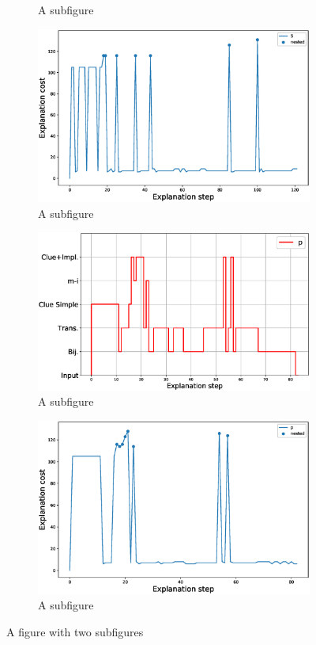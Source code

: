 {\begin{figure}[t!]
\begin{subfigure}{.5\textwidth}
		\caption{A subfigure}
	\end{subfigure}%
	\begin{subfigure}{.5\textwidth}
		\centering
		\includegraphics[width=0.9\linewidth]{figures/5.eps}
		\caption{A subfigure}
	\end{subfigure}
	\begin{subfigure}{.5\textwidth}
		\centering
		\includegraphics[width=0.98\linewidth]{figures/plot_cost_steps_p.eps}
		\caption{A subfigure}
	\end{subfigure}%
	\begin{subfigure}{.5\textwidth}
		\centering
		\includegraphics[width=0.9\linewidth]{figures/p.eps}
		\caption{A subfigure}
	\end{subfigure}
	\caption{A figure with two subfigures}
	\label{fig:steps}
\end{figure}
}
